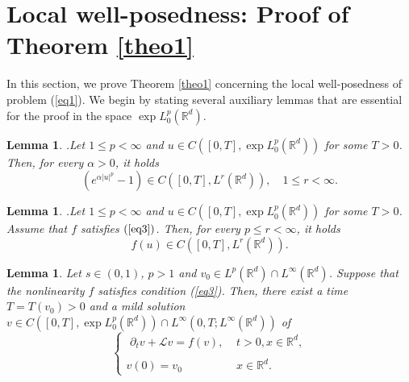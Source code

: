 \documentclass[a4paper,11pt]{amsart}
\renewcommand\eqref[1]{(\ref{#1})} %
\numberwithin{equation}{section}
\theoremstyle{plain}
\newtheorem{lemma}[theorem]{Lemma}
\theoremstyle{definition}
\begin{document}
 
 \section{Local well-posedness: Proof of Theorem \ref{theo1}}\label{sec4}
 In this section, we prove Theorem \ref{theo1} concerning the local well-posedness of problem \eqref{eq1}. We begin by stating several auxiliary lemmas that are essential for the proof in the space $\exp L^p_0(\mathbb{R}^d)$.
 
 

 
 
 \begin{lemma}\cite[Proposition~2.9]{Majdoub2}.\label{prop3} 
Let $1\leq p<\infty$ and $u\in C([0,T],\exp L^p_0(\mathbb{R}^d))$ for some $T>0$. Then, for every $\alpha>0$, it holds
$$\left(e^{\alpha|u|^p}-1\right)\in C([0,T],L^r(\mathbb{R}^d)),\quad 1\leq r<\infty.$$
\end{lemma}
\begin{lemma}\cite[Corollary~2.13]{Majdoub2}.\label{corollary1}
Let $1\leq p<\infty$ and $u\in C([0,T],\exp L^p_0(\mathbb{R}^d))$ for some $T>0$. Assume that $f$ satisfies $(\ref{eq3})$. Then, for every $p\leq r<\infty$, it holds
$$f(u)\in C([0,T],L^r(\mathbb{R}^d)).$$
\end{lemma}
\begin{lemma}${}$\label{lemma7} 
Let $s\in(0,1)$, $p>1$ and $v_0\in L^p(\mathbb{R}^d)\cap L^\infty(\mathbb{R}^d)$. Suppose that the nonlinearity $f$ satisfies condition \emph{(\ref{eq3})}. Then, there exist a time $T=T(v_0)>0$ and a mild solution $v\in C([0,T],\exp L^p_0(\mathbb{R}^d))\cap L^\infty(0,T;L^\infty(\mathbb{R}^d))$ of 
\begin{equation}\label{eq24}
\left\{\begin{array}{ll}
\,\, \displaystyle {\partial_t v+\mathcal{L}v =f(v),} &\displaystyle {t>0,x\in {\mathbb{R}^d},}\\
{}\\
\displaystyle{v(0)=  v_0 \qquad\qquad}&\displaystyle{x\in {\mathbb{R}^d}}.
\end{array}
\right.
\end{equation} 
 \end{lemma}
\end{document}
